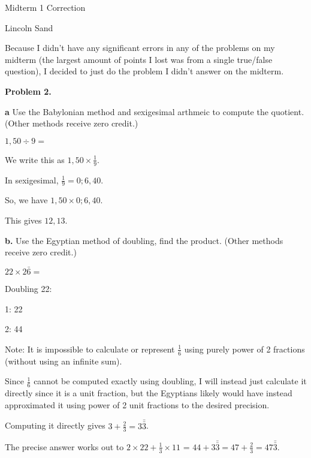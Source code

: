 \documentclass{article}
\begin{document}
\Large{Midterm 1 Correction}

\Large{Lincoln Sand}

\normalsize{Because I didn't have any significant errors in any of the problems
on my midterm (the largest amount of points I lost was from a
single true/false question), I decided to just do the problem I
didn't answer on the midterm.}

\textbf{Problem 2.}


\textbf{a} Use the Babylonian method and sexigesimal arthmeic to compute the quotient.
(Other methods receive zero credit.)

$1,50 \div 9 =$

We write this as $1,50 \times \frac{1}{9}$.

In sexigesimal, $\frac{1}{9} = 0;6,40$.

So, we have $1,50 \times 0;6,40$.

\Large{This gives $12,13$.}

\normalsize{\textbf{b.} Use the Egyptian method of doubling, find the product.
(Other methods receive zero credit.)}

$22 \times 2 \bar{6} =$

Doubling 22:

1: 22

2: 44

Note: It is impossible to calculate or represent $\frac{1}{6}$
using purely power of 2 fractions (without using an infinite sum).

Since $\frac{1}{6}$ cannot be computed exactly using doubling,
I will instead just calculate it directly since it is a unit fraction, but the Egyptians
likely would have instead approximated it using power of 2 unit fractions to the desired precision.

Computing it directly gives $3 + \frac{2}{3} = 3 \bar{\bar{3}}$.

\Large{The precise answer works out to $2 \times 22 + \frac{1}{3} \times 11$
= $44 + 3 \bar{\bar{3}} = 47 + \frac{2}{3} = 47 \bar{\bar{3}}$.}
\end{document}
